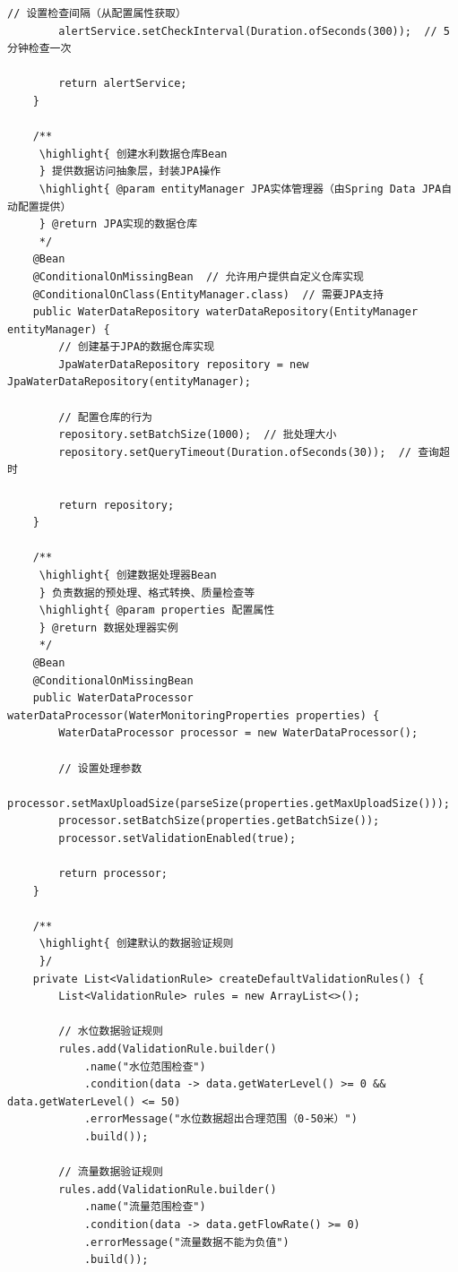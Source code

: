\begin{lstlisting}[style=java]
        // 设置检查间隔（从配置属性获取）
        alertService.setCheckInterval(Duration.ofSeconds(300));  // 5分钟检查一次
        
        return alertService;
    }
    
    /**
     \highlight{ 创建水利数据仓库Bean
     } 提供数据访问抽象层，封装JPA操作
     \highlight{ @param entityManager JPA实体管理器（由Spring Data JPA自动配置提供）
     } @return JPA实现的数据仓库
     */
    @Bean
    @ConditionalOnMissingBean  // 允许用户提供自定义仓库实现
    @ConditionalOnClass(EntityManager.class)  // 需要JPA支持
    public WaterDataRepository waterDataRepository(EntityManager entityManager) {
        // 创建基于JPA的数据仓库实现
        JpaWaterDataRepository repository = new JpaWaterDataRepository(entityManager);
        
        // 配置仓库的行为
        repository.setBatchSize(1000);  // 批处理大小
        repository.setQueryTimeout(Duration.ofSeconds(30));  // 查询超时
        
        return repository;
    }
    
    /**
     \highlight{ 创建数据处理器Bean
     } 负责数据的预处理、格式转换、质量检查等
     \highlight{ @param properties 配置属性
     } @return 数据处理器实例
     */
    @Bean
    @ConditionalOnMissingBean
    public WaterDataProcessor waterDataProcessor(WaterMonitoringProperties properties) {
        WaterDataProcessor processor = new WaterDataProcessor();
        
        // 设置处理参数
        processor.setMaxUploadSize(parseSize(properties.getMaxUploadSize()));
        processor.setBatchSize(properties.getBatchSize());
        processor.setValidationEnabled(true);
        
        return processor;
    }
    
    /**
     \highlight{ 创建默认的数据验证规则
     }/
    private List<ValidationRule> createDefaultValidationRules() {
        List<ValidationRule> rules = new ArrayList<>();
        
        // 水位数据验证规则
        rules.add(ValidationRule.builder()
            .name("水位范围检查")
            .condition(data -> data.getWaterLevel() >= 0 && data.getWaterLevel() <= 50)
            .errorMessage("水位数据超出合理范围（0-50米）")
            .build());
        
        // 流量数据验证规则
        rules.add(ValidationRule.builder()
            .name("流量范围检查")
            .condition(data -> data.getFlowRate() >= 0)
            .errorMessage("流量数据不能为负值")
            .build());
        

\end{lstlisting}
